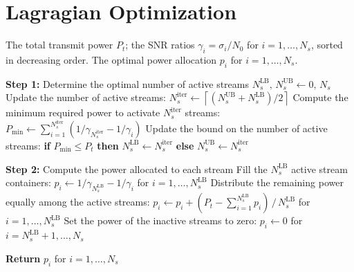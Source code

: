 \chapter{Lagragian Optimization}
\label{appendix:lagrange_and_waterfilling}

\begin{algorithm}[H]
\caption{Waterfilling Algorithm for power allocation across eigen subchannels}
\label{alg:waterfilling}
\begin{algorithmic}[1]
    \Require The total transmit power $P_t$; the SNR ratios $\gamma_i = \sigma_i / N_0$ for $i = 1, \dots, N_s$, sorted in decreasing order.
    \Ensure  The optimal power allocation $p_i$ for $i = 1, \dots, N_s$.
    
    \smallskip
    \Statex \hspace{-\algorithmicindent}\textbf{Step 1:} Determine the optimal number of active streams
    \State $N_s^{\mathrm{LB}}, \, N_s^{\mathrm{UB}} \leftarrow 0, \, N_s$
        \Statex \hspace{\algorithmicindent/2} Update the number of active streams: 
        \State \hspace{\algorithmicindent/2} $N_s^{\mathrm{iter}} \leftarrow \left\lceil (N_s^{\mathrm{UB}} + N_s^{\mathrm{LB}}) / 2 \right\rceil$
        \Statex \hspace{\algorithmicindent/2} Compute the minimum required power to activate $N_s^{\mathrm{iter}}$ streams:
        \State \hspace{\algorithmicindent/2} $P_{\mathrm{min}} \leftarrow \textstyle\sum_{i=1}^{N_s^{\mathrm{iter}}} \left( 1/\gamma_{N_s^{\mathrm{iter}}} - 1/\gamma_i \right)$
        \Statex \hspace{\algorithmicindent/2} Update the bound on the number of active streams:
        \State \hspace{\algorithmicindent/2} \textbf{if} $P_{\mathrm{min}} \leq P_t$ \textbf{then} $N_s^{\mathrm{LB}} \leftarrow N_s^{\mathrm{iter}}$ \textbf{else} $N_s^{\mathrm{UB}} \leftarrow N_s^{\mathrm{iter}}$
    \EndWhile
    
    \smallskip
    \Statex \hspace{-\algorithmicindent}\textbf{Step 2:} Compute the power allocated to each stream
    \Statex Fill the $N_s^{\mathrm{LB}}$ active stream containers:
    \State \indent $p_i \leftarrow 1/\gamma_{N_s^{\mathrm{LB}}} - 1/\gamma_i$ \quad for $i = 1, \dots, N_s^{\mathrm{LB}}$
    \Statex Distribute the remaining power equally among the active streams:
    \State \indent $p_i \leftarrow p_i + (P_t - \textstyle\sum_{i=1}^{N_s^{\mathrm{LB}}} p_i)\, /\, N_s^{\mathrm{LB}}$ \quad for $i = 1, \dots, N_s^{\mathrm{LB}}$
    \Statex Set the power of the inactive streams to zero:
    \State \indent $p_i \leftarrow 0$ \quad for $i = N_s^{\mathrm{LB}} + 1, \dots, N_s$
    
    \smallskip
    \Statex \hspace{-\algorithmicindent}\textbf{Return} $p_i$ for $i = 1, \dots, N_s$
\end{algorithmic}
\end{algorithm}